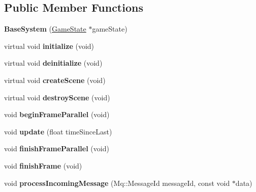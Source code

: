 \subsection*{Public Member Functions}
\begin{DoxyCompactItemize}
\item 
\mbox{\label{class_common_1_1_base_system_a420a9f2bb9ccec58af8de74cfc71a9fd}} 
{\bfseries Base\+System} (\hyperlink{class_common_1_1_game_state}{Game\+State} $\ast$game\+State)
\item 
\mbox{\label{class_common_1_1_base_system_a84f42ac8703c9121f29e341070a26c4f}} 
virtual void {\bfseries initialize} (void)
\item 
\mbox{\label{class_common_1_1_base_system_a081f0d3daaff552efe736e6096d329e9}} 
virtual void {\bfseries deinitialize} (void)
\item 
\mbox{\label{class_common_1_1_base_system_a1f26fc7376152a90de585fd50c396427}} 
virtual void {\bfseries create\+Scene} (void)
\item 
\mbox{\label{class_common_1_1_base_system_a04ce870b4d3429942afb58137fd376ca}} 
virtual void {\bfseries destroy\+Scene} (void)
\item 
\mbox{\label{class_common_1_1_base_system_a631f234a7a0e46e9f6476520cd2f9bab}} 
void {\bfseries begin\+Frame\+Parallel} (void)
\item 
\mbox{\label{class_common_1_1_base_system_af71a7156da8b0a4feab83ad72162a0c2}} 
void {\bfseries update} (float time\+Since\+Last)
\item 
\mbox{\label{class_common_1_1_base_system_a50d9e0044a1cc4b400b847c923913d81}} 
void {\bfseries finish\+Frame\+Parallel} (void)
\item 
\mbox{\label{class_common_1_1_base_system_ad8d31cde53383edccb40c3b986252f1c}} 
void {\bfseries finish\+Frame} (void)
\item 
\mbox{\label{class_common_1_1_base_system_a6820dfed1ee63f376e5773b361e3d2a8}} 
void {\bfseries process\+Incoming\+Message} (Mq\+::\+Message\+Id message\+Id, const void $\ast$data)
\end{DoxyCompactItemize}
